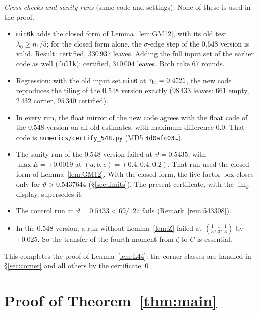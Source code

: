 \documentclass[11pt]{amsart}
\theoremstyle{definition}
\theoremstyle{remark}
\newcommand{\Lfp}{Lemma~\ref{lem:L44}}
\begin{document}
\emph{Cross-checks and sanity runs} (same code and settings). None of these is used in the proof.
\begin{itemize}[leftmargin=*]
\item \texttt{min0k} adds the closed form of Lemma~\ref{lem:GM12}, with its old test $\lambda_0\ge n_1/5$; for the closed form alone, the
$\sigma$-edge step of the $0.548$ version is valid. Result: certified, $330\,937$ leaves. Adding the full input set of the earlier code as well
(\texttt{fullk}): certified, $310\,004$ leaves. Both take 67 rounds.
\item Regression: with the old input set \texttt{min0} at $\tau_{\rm hi}=0.4521$, the new code reproduces the tiling of the $0.548$ version
exactly ($98\,433$ leaves: $661$ empty, $2\,432$ corner, $95\,340$ certified).
\item In every run, the float mirror of the new code agrees with the float code of the $0.548$ version on all old estimates, with maximum
difference $0.0$. That code is \nolinkurl{numerics/certify_548.py} (MD5 \texttt{4d0afc03\dots}).
\item The sanity run of the $0.548$ version failed at $\vartheta=0.5435$, with $\max E=+0.0019$ at $(a,b,c)=(0.4,0.4,0.2)$. That run used the
closed form of Lemma~\ref{lem:GM12}. With the closed form, the five-factor box closes only for $\vartheta>0.5437644$ (\S\ref{sec:limits}). The
present certificate, with the $\inf_k$ display, supersedes it.
\item The control run at $\vartheta=0.5433<69/127$ fails (Remark~\ref{rem:543308}).
\item In the $0.548$ version, a run without Lemma~\ref{lem:Z} failed at $(\frac13,\frac13,\frac13)$ by $+0.025$. So the transfer of the fourth
moment from $\zeta$ to $C$ is essential.
\end{itemize}

This completes the proof of \Lfp: the corner classes are handled in \S\ref{sec:corner} and all others by the certificate.\qed

\section{Proof of Theorem~\ref{thm:main}}\label{sec:proof}
\end{document}
